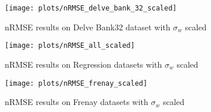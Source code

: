 \begin{figure}
    \texttt{[image: plots/nRMSE\_delve\_bank\_32\_scaled]}
    \caption{nRMSE results on Delve Bank32 dataset with $\sigma_w$ scaled}
\end{figure}

\begin{figure}
    \texttt{[image: plots/nRMSE\_all\_scaled]}
    \caption{nRMSE results on Regression datasets with $\sigma_w$ scaled}
\end{figure}

\begin{figure}
    \texttt{[image: plots/nRMSE\_frenay\_scaled]}
    \caption{nRMSE results on Frenay datasets with $\sigma_w$ scaled}
\end{figure}

